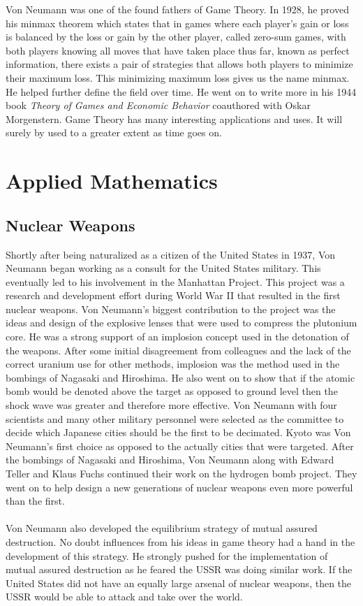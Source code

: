 \documentclass[12pt]{article}
\begin{document}
	
	Von Neumann was one of the found fathers of Game Theory. In 1928, he proved his minmax theorem which states that in games where each player's gain or loss is balanced by the loss or gain by the other player, called zero-sum games, with both players knowing all moves that have taken place thus far, known as perfect information, there exists a pair of strategies that allows both players to minimize their maximum loss. This minimizing maximum loss gives us the name minmax. He helped further define the field over time. He went on to write more in his 1944 book \textit{Theory of Games and Economic Behavior} coauthored with Oskar Morgenstern. Game Theory has many interesting applications and uses. It will surely by used to a greater extent as time goes on.
\section*{Applied Mathematics}
\subsection*{Nuclear Weapons}
	Shortly after being naturalized as a citizen of the United States in 1937, Von Neumann began working as a consult for the United States military. This eventually led to his involvement in the Manhattan Project. This project was a research and development effort during World War II that resulted in the first nuclear weapons. Von Neumann's biggest contribution to the project was the ideas and design of the explosive lenses that were used to compress the plutonium core. 
	He was a strong support of an implosion concept used in the detonation of the weapons. After some initial disagreement from colleagues and the lack of the correct uranium use for other methods, implosion was the method used in the bombings of Nagasaki and Hiroshima. He also went on to show that if the atomic bomb would be denoted above the target as opposed to ground level then the shock wave was greater and therefore more effective. Von Neumann with four scientists and many other military personnel were selected as the committee to decide which Japanese cities should be the first to be decimated. Kyoto was Von Neumann's first choice as opposed to the actually cities that were targeted.
	After the bombings of Nagasaki and Hiroshima, Von Neumann along with Edward Teller and Klaus Fuchs continued their work on the hydrogen bomb project. They went on to help design a new generations of nuclear weapons even more powerful than the first. \\
	\\
	Von Neumann also developed the equilibrium strategy of mutual assured destruction. No doubt influences from his ideas in game theory had a hand in the development of this strategy. He strongly pushed for the implementation of mutual assured destruction as he feared the USSR was doing similar work. If the United States did not have an equally large arsenal of nuclear weapons, then the USSR would be able to attack and take over the world.
\end{document}
